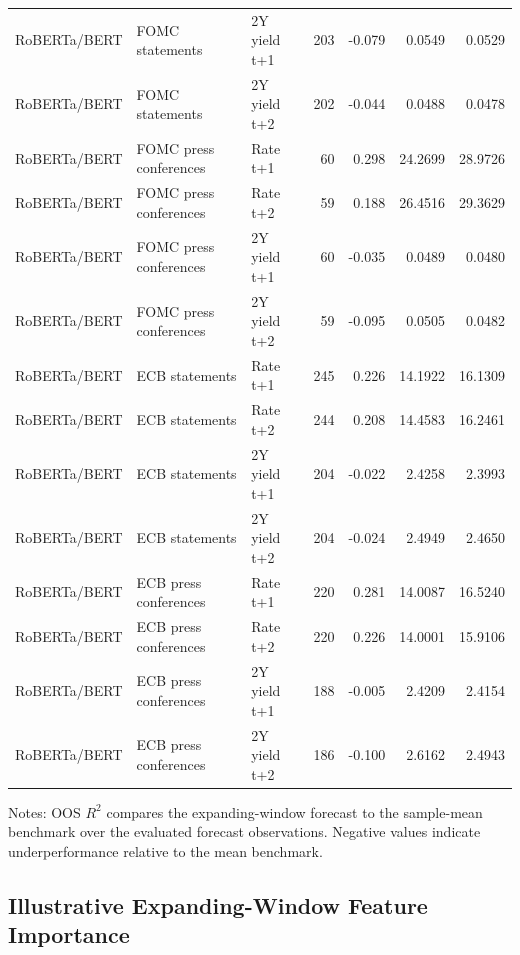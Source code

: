 \begin{table}[H]
\begin{threeparttable}
{\begin{tabular}{lllrrrr}
RoBERTa\slash BERT & FOMC statements & 2Y yield t+1 & 203 & -0.079 & 0.0549 & 0.0529 \\
RoBERTa\slash BERT & FOMC statements & 2Y yield t+2 & 202 & -0.044 & 0.0488 & 0.0478 \\
RoBERTa\slash BERT & FOMC press conferences & Rate t+1 & 60 & 0.298 & 24.2699 & 28.9726 \\
RoBERTa\slash BERT & FOMC press conferences & Rate t+2 & 59 & 0.188 & 26.4516 & 29.3629 \\
RoBERTa\slash BERT & FOMC press conferences & 2Y yield t+1 & 60 & -0.035 & 0.0489 & 0.0480 \\
RoBERTa\slash BERT & FOMC press conferences & 2Y yield t+2 & 59 & -0.095 & 0.0505 & 0.0482 \\
RoBERTa\slash BERT & ECB statements & Rate t+1 & 245 & 0.226 & 14.1922 & 16.1309 \\
RoBERTa\slash BERT & ECB statements & Rate t+2 & 244 & 0.208 & 14.4583 & 16.2461 \\
RoBERTa\slash BERT & ECB statements & 2Y yield t+1 & 204 & -0.022 & 2.4258 & 2.3993 \\
RoBERTa\slash BERT & ECB statements & 2Y yield t+2 & 204 & -0.024 & 2.4949 & 2.4650 \\
RoBERTa\slash BERT & ECB press conferences & Rate t+1 & 220 & 0.281 & 14.0087 & 16.5240 \\
RoBERTa\slash BERT & ECB press conferences & Rate t+2 & 220 & 0.226 & 14.0001 & 15.9106 \\
RoBERTa\slash BERT & ECB press conferences & 2Y yield t+1 & 188 & -0.005 & 2.4209 & 2.4154 \\
RoBERTa\slash BERT & ECB press conferences & 2Y yield t+2 & 186 & -0.100 & 2.6162 & 2.4943 \\
\bottomrule
\end{tabular}
}
\begin{tablenotes}
\footnotesize
\item Notes: OOS $R^2$ compares the expanding-window forecast to the sample-mean benchmark over the evaluated forecast observations. Negative values indicate underperformance relative to the mean benchmark.
\end{tablenotes}
\end{threeparttable}
\end{table}

\subsection{Illustrative Expanding-Window Feature Importance}
\label{app:rf_single_xw_importance}

